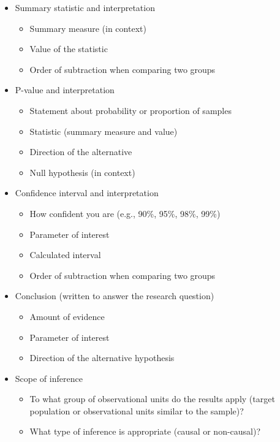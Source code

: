 \documentclass[
]{report}
\begin{document}
\begin{itemize}
\item
  Summary statistic and interpretation

  \begin{itemize}
  \item
    Summary measure (in context)
  \item
    Value of the statistic
  \item
    Order of subtraction when comparing two groups
  \end{itemize}
\item
  P-value and interpretation

  \begin{itemize}
  \item
    Statement about probability or proportion of samples
  \item
    Statistic (summary measure and value)
  \item
    Direction of the alternative
  \item
    Null hypothesis (in context)
  \end{itemize}
\item
  Confidence interval and interpretation

  \begin{itemize}
  \item
    How confident you are (e.g., 90\%, 95\%, 98\%, 99\%)
  \item
    Parameter of interest
  \item
    Calculated interval
  \item
    Order of subtraction when comparing two groups
  \end{itemize}
\item
  Conclusion (written to answer the research question)

  \begin{itemize}
  \item
    Amount of evidence
  \item
    Parameter of interest
  \item
    Direction of the alternative hypothesis
  \end{itemize}
\end{itemize}

\newpage

\begin{itemize}
\item
  Scope of inference

  \begin{itemize}
  \item
    To what group of observational units do the results apply (target population or observational units similar to the sample)?
  \item
    What type of inference is appropriate (causal or non-causal)?
  \end{itemize}
\end{itemize}
\end{document}
